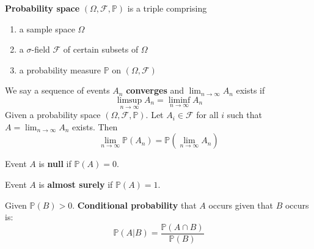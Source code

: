 \documentclass{huhtakm-template-book}
\newcommand{\prob}{\mathbb{P}}
\begin{document}
\begin{sdefn}
	\textbf{Probability space} $(\Omega,\mathcal{F},\prob)$ is a triple comprising 
	\begin{enumerate}
		\item a sample space $\Omega$
		\item a $\sigma$-field $\mathcal{F}$ of certain subsets of $\Omega$
		\item a probability measure $\prob$ on $(\Omega,\mathcal{F})$
	\end{enumerate}
\end{sdefn}
\begin{sdefn}
	We say a sequence of events $A_{n}$ \textbf{converges} and $\lim_{n\to\infty}A_{n}$ exists if
	\begin{equation*}
		\limsup_{n\to\infty}A_{n}=\liminf_{n\to\infty}A_{n}
	\end{equation*}
	Given a probability space $(\Omega,\mathcal{F},\prob)$. Let $A_{i}\in\mathcal{F}$ for all $i$ such that $A=\lim_{n\to\infty}A_{n}$ exists. Then
	\begin{equation*}
		\lim_{n\to\infty}\prob(A_{n})=\prob\left(\lim_{n\to\infty}A_{n}\right)
	\end{equation*}
\end{sdefn}
\begin{sdefn}
	Event $A$ is \textbf{null} if $\prob(A)=0$.
\end{sdefn}
\begin{sdefn}
	Event $A$ is \textbf{almost surely} if $\prob(A)=1$.
\end{sdefn}
\begin{sdefn}
	Given $\prob(B)>0$. \textbf{Conditional probability} that $A$ occurs given that $B$ occurs is:
	\begin{equation*}
		\prob(A|B)=\frac{\prob(A\cap B)}{\prob(B)}
	\end{equation*}
\end{sdefn}
\end{document}
